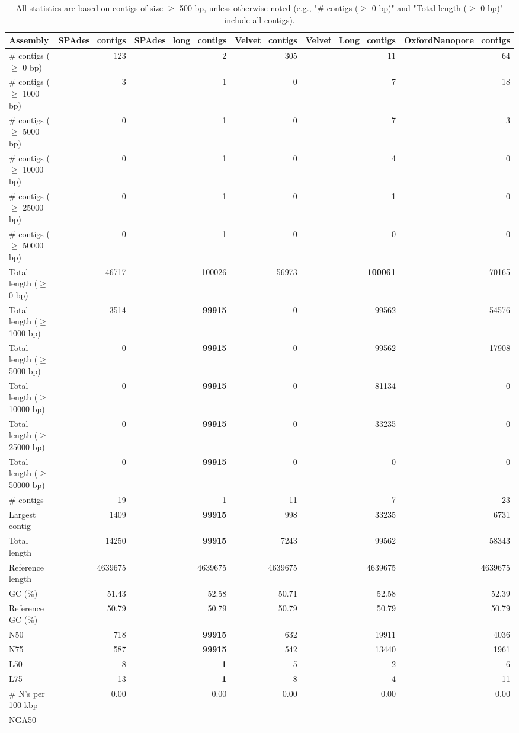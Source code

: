 \documentclass[12pt,a4paper]{article}
\begin{document}
\begin{table}[ht]
\begin{center}
\caption{All statistics are based on contigs of size $\geq$ 500 bp, unless otherwise noted (e.g., "\# contigs ($\geq$ 0 bp)" and "Total length ($\geq$ 0 bp)" include all contigs).}
\begin{tabular}{|l*{5}{|r}|}
\hline
Assembly & SPAdes\_contigs & SPAdes\_long\_contigs & Velvet\_contigs & Velvet\_Long\_contigs & OxfordNanopore\_contigs \\ \hline
\# contigs ($\geq$ 0 bp) & 123 & 2 & 305 & 11 & 64 \\ \hline
\# contigs ($\geq$ 1000 bp) & 3 & 1 & 0 & 7 & 18 \\ \hline
\# contigs ($\geq$ 5000 bp) & 0 & 1 & 0 & 7 & 3 \\ \hline
\# contigs ($\geq$ 10000 bp) & 0 & 1 & 0 & 4 & 0 \\ \hline
\# contigs ($\geq$ 25000 bp) & 0 & 1 & 0 & 1 & 0 \\ \hline
\# contigs ($\geq$ 50000 bp) & 0 & 1 & 0 & 0 & 0 \\ \hline
Total length ($\geq$ 0 bp) & 46717 & 100026 & 56973 & {\bf 100061} & 70165 \\ \hline
Total length ($\geq$ 1000 bp) & 3514 & {\bf 99915} & 0 & 99562 & 54576 \\ \hline
Total length ($\geq$ 5000 bp) & 0 & {\bf 99915} & 0 & 99562 & 17908 \\ \hline
Total length ($\geq$ 10000 bp) & 0 & {\bf 99915} & 0 & 81134 & 0 \\ \hline
Total length ($\geq$ 25000 bp) & 0 & {\bf 99915} & 0 & 33235 & 0 \\ \hline
Total length ($\geq$ 50000 bp) & 0 & {\bf 99915} & 0 & 0 & 0 \\ \hline
\# contigs & 19 & 1 & 11 & 7 & 23 \\ \hline
Largest contig & 1409 & {\bf 99915} & 998 & 33235 & 6731 \\ \hline
Total length & 14250 & {\bf 99915} & 7243 & 99562 & 58343 \\ \hline
Reference length & 4639675 & 4639675 & 4639675 & 4639675 & 4639675 \\ \hline
GC (\%) & 51.43 & 52.58 & 50.71 & 52.58 & 52.39 \\ \hline
Reference GC (\%) & 50.79 & 50.79 & 50.79 & 50.79 & 50.79 \\ \hline
N50 & 718 & {\bf 99915} & 632 & 19911 & 4036 \\ \hline
N75 & 587 & {\bf 99915} & 542 & 13440 & 1961 \\ \hline
L50 & 8 & {\bf 1} & 5 & 2 & 6 \\ \hline
L75 & 13 & {\bf 1} & 8 & 4 & 11 \\ \hline
\# N's per 100 kbp & 0.00 & 0.00 & 0.00 & 0.00 & 0.00 \\ \hline
NGA50 & - & - & - & - & - \\ \hline
\end{tabular}
\end{center}
\end{table}
\end{document}
